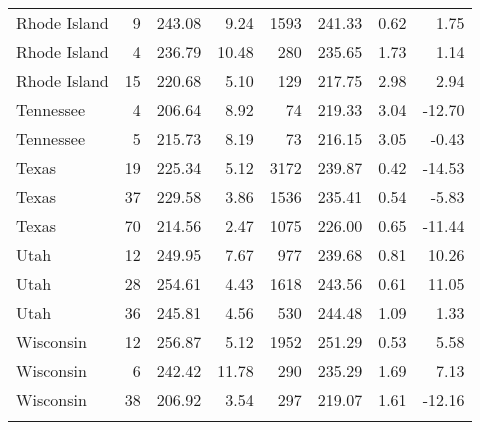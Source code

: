 \begin{longtable}{lrrr@{\extracolsep{10pt}}rrrr}
  Rhode Island &   9 & 243.08 & 9.24 & 1593 & 241.33 & 0.62 & 1.75 \\ 
  Rhode Island &   4 & 236.79 & 10.48 & 280 & 235.65 & 1.73 & 1.14 \\ 
  Rhode Island &  15 & 220.68 & 5.10 & 129 & 217.75 & 2.98 & 2.94 \\ 
  Tennessee &   4 & 206.64 & 8.92 &  74 & 219.33 & 3.04 & -12.70 \\ 
  Tennessee &   5 & 215.73 & 8.19 &  73 & 216.15 & 3.05 & -0.43 \\ 
  Texas &  19 & 225.34 & 5.12 & 3172 & 239.87 & 0.42 & -14.53 \\ 
  Texas &  37 & 229.58 & 3.86 & 1536 & 235.41 & 0.54 & -5.83 \\ 
  Texas &  70 & 214.56 & 2.47 & 1075 & 226.00 & 0.65 & -11.44 \\ 
  Utah &  12 & 249.95 & 7.67 & 977 & 239.68 & 0.81 & 10.26 \\ 
  Utah &  28 & 254.61 & 4.43 & 1618 & 243.56 & 0.61 & 11.05 \\ 
  Utah &  36 & 245.81 & 4.56 & 530 & 244.48 & 1.09 & 1.33 \\ 
  Wisconsin &  12 & 256.87 & 5.12 & 1952 & 251.29 & 0.53 & 5.58 \\ 
  Wisconsin &   6 & 242.42 & 11.78 & 290 & 235.29 & 1.69 & 7.13 \\ 
  Wisconsin &  38 & 206.92 & 3.54 & 297 & 219.07 & 1.61 & -12.16 \\ 
   \hline
\hline
\label{g4mathlrlevel1}
\end{longtable}
